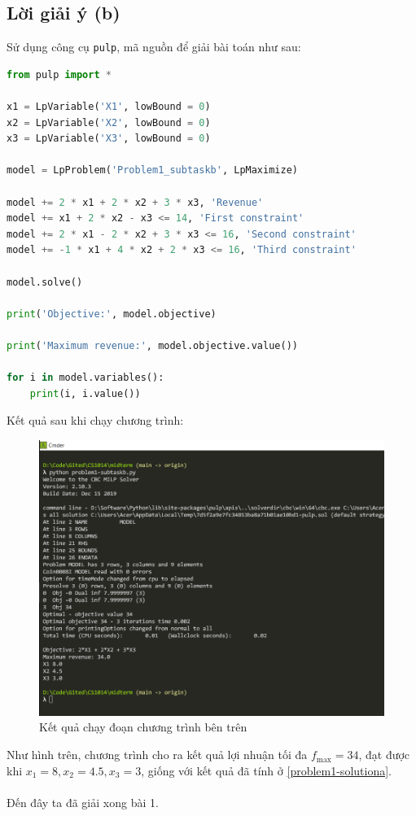 \documentclass[12pt]{article}
\begin{document}
\subsection{Lời giải ý (b)}
Sử dụng công cụ \texttt{pulp}, mã nguồn để giải bài toán như sau:
\begin{lstlisting}[language=Python]
from pulp import *

x1 = LpVariable('X1', lowBound = 0)
x2 = LpVariable('X2', lowBound = 0)
x3 = LpVariable('X3', lowBound = 0)

model = LpProblem('Problem1_subtaskb', LpMaximize)

model += 2 * x1 + 2 * x2 + 3 * x3, 'Revenue'
model += x1 + 2 * x2 - x3 <= 14, 'First constraint'
model += 2 * x1 - 2 * x2 + 3 * x3 <= 16, 'Second constraint'
model += -1 * x1 + 4 * x2 + 2 * x3 <= 16, 'Third constraint'

model.solve()

print('Objective:', model.objective)

print('Maximum revenue:', model.objective.value())

for i in model.variables():
    print(i, i.value())
\end{lstlisting}
Kết quả sau khi chạy chương trình:
\begin{figure}[H]
    \centering
    \includegraphics[scale=.65]{img/problem1-console.PNG}
    \caption{Kết quả chạy đoạn chương trình bên trên}
\end{figure}
\noindent Như hình trên, chương trình cho ra kết quả lợi nhuận tối đa $f_{\max} = 34$, đạt được khi $x_1 = 8, x_2 = 4.5, x_3 = 3$, giống với kết quả đã tính ở \ref{problem1-solutiona}.
\\\\
Đến đây ta đã giải xong bài 1.
\pagebreak
\end{document}
